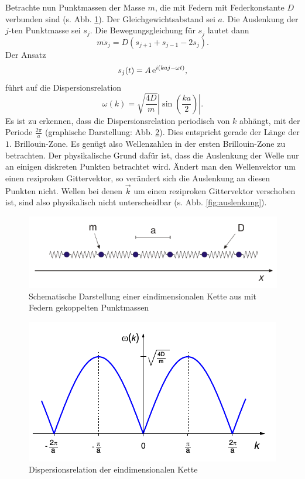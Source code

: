 Betrachte nun Punktmassen der Masse $m$, die mit Federn mit Federkonstante $D$ verbunden sind (s. Abb. \ref{fig:1d_kette}). Der Gleichgewichtsabstand sei $a$. Die Auslenkung der $j$-ten Punktmasse sei $s_{j}$. Die Bewegungsgleichung für $s_{j}$ lautet dann
\begin{equation}
  m\ddot{s}_{j} = D\left( s_{j+1} + s_{j-1} -2s_{j} \right).
\end{equation}
Der Ansatz
\begin{equation}
 s_{j}(t) = A \operatorname{e}^{i(kaj-\omega t)},
\end{equation}
führt auf die Dispersionsrelation
\begin{equation}
 \omega(k) = \sqrt{\frac{4D}{m}} \left|\sin\left(\frac{ka}{2}\right)\right|.
\end{equation}
Es ist zu erkennen, dass die Dispersionsrelation periodisch von $k$ abhängt, mit der Periode $\frac{2\pi}{a}$ (graphische Darstellung: Abb. \ref{fig:brillouin_1}). Dies entspricht gerade der Länge der $1.$ Brillouin-Zone. Es genügt also Wellenzahlen in der ersten Brillouin-Zone zu betrachten. Der physikalische Grund dafür ist, dass die Auslenkung der Welle nur an einigen diskreten Punkten betrachtet wird. Ändert man den Wellenvektor um einen reziproken Gittervektor, so verändert sich die Auslenkung an diesen Punkten nicht. Wellen bei denen $\vec{k}$ um einen reziproken Gittervektor verschoben ist, sind also physikalisch nicht unterscheidbar (s. Abb. \ref{fig:auslenkung}).

\begin{figure}[tb]
  \centering
  \includegraphics[scale=1.0]{./fig/1d_kette.png}
  \caption{Schematische Darstellung einer eindimensionalen Kette aus mit Federn gekoppelten Punktmassen \cite{Litmap}}
  \label{fig:1d_kette}
\end{figure}

\begin{figure}[tb]
  \centering
  \includegraphics[scale=1.0]{./fig/brillouin_1.png}
  \caption{Dispersionsrelation der eindimensionalen Kette \cite{Litmap}}
  \label{fig:brillouin_1}
\end{figure}

